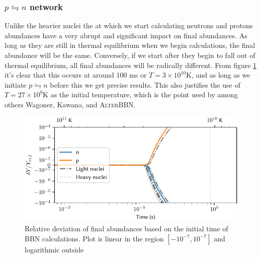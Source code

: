 \subsubsection{$p\leftrightharpoons n$ network}
Unlike the heavier nuclei the at which we start calculating neutrons and protons abundances have a very abrupt and significant impact on final abundances. As long as they are still in thermal equilibrium when we begin calculations, the final abundance will be the same. Conversely, if we start after they begin to fall out of thermal equilibrium, all final abundances will be radically different. From figure \ref{fig:npnettime} it's clear that this occurs at around 100 ms or $T=3\times10^{10}$K, and as long as we initiate $p\leftrightharpoons n$ before this we get precise results. This also justifies the use of $T=27\times10^9$K as the initial temperature, which is the point used by among others Wagoner, Kawano, and \textsc{AlterBBN}.
\begin{figure}[ht]
    \includegraphics[width=5.1in]{figures/npnettime.pdf}
    \caption{Relative deviation of final abundances based on the initial time of BBN calculations. Plot is linear in the region $[-10^{-7},10^{-7}]$ and logarithmic outside}
    \label{fig:npnettime}
\end{figure}



